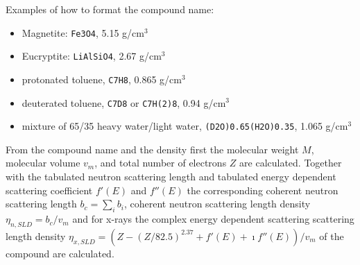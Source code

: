 Examples of how to format the compound name:
\begin{itemize}
\item Magnetite: \texttt{Fe3O4}, 5.15 g/cm$^3$
\item Eucryptite: \texttt{LiAlSiO4}, 2.67 g/cm$^3$
\item protonated toluene, \texttt{C7H8}, 0.865 g/cm$^3$
\item deuterated toluene, \texttt{C7D8} or \texttt{C7H(2)8}, 0.94 g/cm$^3$
\item mixture of 65/35 heavy water/light water, \texttt{(D2O)0.65(H2O)0.35}, 1.065 g/cm$^3$
\end{itemize}
From the compound name and the density first the molecular weight $M$, molecular volume $v_m$,
and total number of electrons $Z$ are calculated. Together with the tabulated neutron scattering length and
tabulated energy dependent scattering coefficient $f'(E)$ and $f''(E)$ the corresponding coherent
neutron scattering length $b_c=\sum_i b_i$, coherent neutron scattering length density
$\eta_{n,SLD}=b_c/v_m$  and
for x-rays the complex energy dependent scattering scattering length density
$\eta_{x,SLD}=\left(Z-(Z/82.5)^{2.37}+f'(E)+\imath f''(E)\right)/v_m$ of the compound are calculated.

